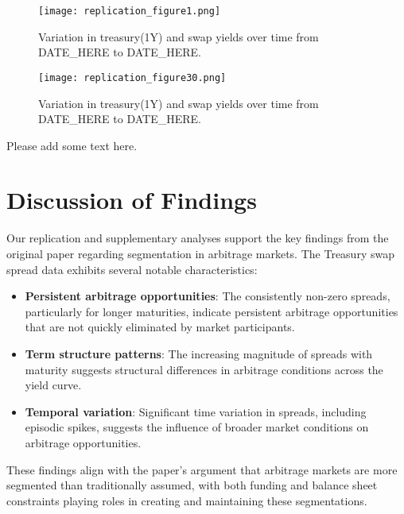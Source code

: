 \documentclass[12pt]{article}
\begin{document}
\begin{figure}[H]
    \centering
    \texttt{[image: replication\_figure1.png]}
    \caption{Variation in treasury(1Y) and swap yields over time from DATE_HERE to DATE_HERE.}
    \label{fig:treasury_swap_spreads_supplementary1}
\end{figure}

\begin{figure}[H]
    \centering
    \texttt{[image: replication\_figure30.png]}
    \caption{Variation in treasury(1Y) and swap yields over time from DATE_HERE to DATE_HERE.}
    \label{fig:treasury_swap_spreads_supplementary30}
\end{figure}

Please add some text here.

\section{Discussion of Findings}

Our replication and supplementary analyses support the key findings from the original paper regarding segmentation in arbitrage markets. The Treasury swap spread data exhibits several notable characteristics:

\begin{itemize}
    \item \textbf{Persistent arbitrage opportunities}: The consistently non-zero spreads, particularly for longer maturities, indicate persistent arbitrage opportunities that are not quickly eliminated by market participants.
    
    \item \textbf{Term structure patterns}: The increasing magnitude of spreads with maturity suggests structural differences in arbitrage conditions across the yield curve.
    
    \item \textbf{Temporal variation}: Significant time variation in spreads, including episodic spikes, suggests the influence of broader market conditions on arbitrage opportunities.
\end{itemize}

These findings align with the paper's argument that arbitrage markets are more segmented than traditionally assumed, with both funding and balance sheet constraints playing roles in creating and maintaining these segmentations.
\end{document}
